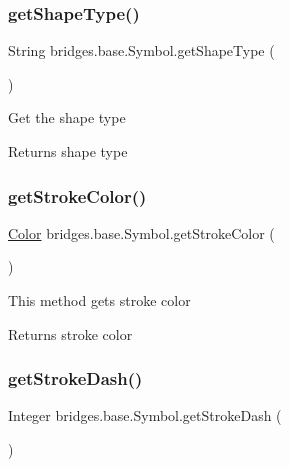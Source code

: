 \subsubsection{\texorpdfstring{getShapeType()}{getShapeType()}}
{\footnotesize\ttfamily String bridges.\+base.\+Symbol.\+get\+Shape\+Type (\begin{DoxyParamCaption}{ }\end{DoxyParamCaption})\hspace{0.3cm}{\ttfamily [protected]}}

Get the shape type

\begin{DoxyReturn}{Returns}
shape type 
\end{DoxyReturn}
\mbox{\label{classbridges_1_1base_1_1_symbol_abd38aaea2fc344adcc8096ed6eb8681c}} 
\subsubsection{\texorpdfstring{getStrokeColor()}{getStrokeColor()}}
{\footnotesize\ttfamily \mbox{\hyperlink{classbridges_1_1base_1_1_color}{Color}} bridges.\+base.\+Symbol.\+get\+Stroke\+Color (\begin{DoxyParamCaption}{ }\end{DoxyParamCaption})}

This method gets stroke color

\begin{DoxyReturn}{Returns}
stroke color 
\end{DoxyReturn}
\mbox{\label{classbridges_1_1base_1_1_symbol_a31ff460ae6b24ed968c1045e2533a967}} 
\subsubsection{\texorpdfstring{getStrokeDash()}{getStrokeDash()}}
{\footnotesize\ttfamily Integer bridges.\+base.\+Symbol.\+get\+Stroke\+Dash (\begin{DoxyParamCaption}{ }\end{DoxyParamCaption})}

